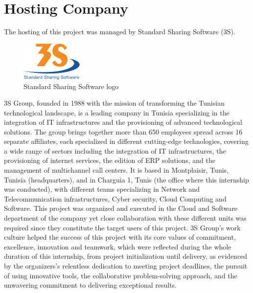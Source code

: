 \section{Hosting Company}
The hosting of this project was managed by Standard Sharing Software (3S).
\smallskip\newline
\begin{figure}[H]
    \centering
    \includegraphics[width=0.4\linewidth]{./figures/logo_3S.png}
    \caption{Standard Sharing Software logo}
\end{figure}
3S Group, founded in 1988 with the mission of transforming the Tunisian technological landscape, is a leading company in Tunisia specializing in the integration of IT infrastructures and the provisioning of advanced technological solutions. The group brings together more than 650 employees spread across 16 separate affiliates, each specialized in different cutting-edge technologies, covering a wide range of sectors including the integration of IT infrastructures, the provisioning of internet services, the edition of ERP solutions, and the management of multichannel call centers.\newline
It is based in Montplaisir, Tunis, Tunisia (headquarters), and in Charguia 1, Tunis (the office where this internship was conducted), with different teams specializing in Network and Telecommunication infrastructures, Cyber security, Cloud Computing and Software. This project was organized and executed in the Cloud and Software department of the company yet close collaboration with these different units was required since they constitute the target users of this project.\newline
3S Group's work culture helped the success of this project with its core values of commitment, excellence, innovation and teamwork, which were reflected during the whole duration of this internship, from project initialization until delivery, as evidenced by the organizers's relentless dedication to meeting project deadlines, the pursuit of using innovative tools, the collaborative problem-solving approach, and the unwavering commitment to delivering exceptional results.


